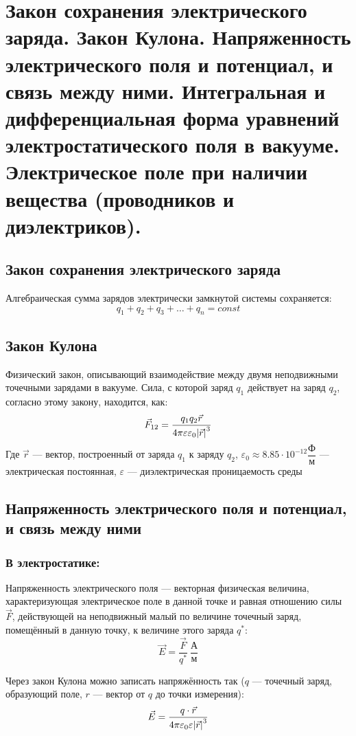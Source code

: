 \documentclass[12pt]{report}
\begin{document}
\section{Закон сохранения электрического заряда. Закон Кулона. Напряженность электрического поля и потенциал, и связь между ними. Интегральная и дифференциальная форма уравнений электростатического поля в вакууме. Электрическое поле при наличии вещества (проводников и диэлектриков).}
\subsection{Закон сохранения электрического заряда}
Алгебраическая сумма зарядов электрически замкнутой системы сохраняется:
\[
    q_1 + q_2 + q_3 + \dots + q_n = const
\]

\subsection{Закон Кулона}
Физический закон, описывающий взаимодействие между двумя неподвижными точечными зарядами в вакууме. Сила, с которой заряд $q_1$ действует на заряд $q_2$, согласно этому закону, находится, как:
\[
    \vec F_{12} = \dfrac{q_1 q_2 \vec r}{4\pi \varepsilon \varepsilon_0 \abs{\vec r}^3}
\]
Где $\vec r$ --- вектор, построенный от заряда $q_1$ к заряду $q_2$, $\varepsilon_0 \approx 8.85 \cdot 10^{-12} \dfrac{\text{Ф}}{\text{м}}$ --- электрическая постоянная, $\varepsilon$ --- диэлектрическая проницаемость среды

\subsection{Напряженность электрического поля и потенциал, и связь между ними}
\subsubsection{В электростатике:}
Напряженность электрического поля --- векторная физическая величина, характеризующая электрическое поле в данной точке и равная отношению силы $\vec F$, действующей на неподвижный малый по величине точечный заряд, помещённый в данную точку, к величине этого заряда $q^*$:
\[
    \vec E = \dfrac{\vec F}{q^*} \ \dfrac{\text{А}}{\text{м}}
\]

Через закон Кулона можно записать напряжённость так ($q$ --- точечный заряд, образующий поле, $r$ --- вектор от $q$ до точки измерения):
\[
    \vec E = \dfrac{q \cdot \vec{r}}{4\pi \varepsilon_0 \varepsilon \abs{\vec{r}}^3}
\]
\end{document}
